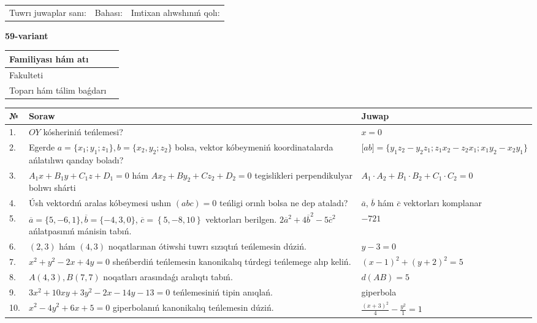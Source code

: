 \documentclass{article}
\begin{document}
\vspace{1cm}

\begin{tabular}{lll}
Tuwrı juwaplar sanı: \underline{\hspace{1.5cm}} & 
Bahası: \underline{\hspace{1.5cm}} & 
Imtixan alıwshınıń qolı: \underline{\hspace{2cm}} \\
\end{tabular}

\egroup

\newpage


\textbf{59-variant}\\

\bgroup
\def\arraystretch{1.6} %

\begin{tabular}{|m{5.7cm}|m{9.5cm}|}
\hline
Familiyası hám atı & \\
\hline
Fakulteti  & \\
\hline
Toparı hám tálim baǵdarı  & \\
\hline
\end{tabular}

\vspace{1cm}

\begin{tabular}{|m{0.7cm}|m{10cm}|m{4cm}|}
\hline
№ & Soraw & Juwap \\
\hline
1. & $OY$ kósheriniń teńlemesi? & $x=0$ \\
\hline
2. & Egerde $a=\{ x_1; y_1; z_1\}, b=\{ x_2, y_2; z_2\}$ bolsa, vektor kóbeymeniń koordinatalarda ańlatılıwı qanday boladı? &  $\lbrack ab\rbrack=\{y_1z_2-y_2z_1; z_1x_2-z_2x_1; x_1y_2-x_2y_1\}$ \\
\hline
3. & $A_1x+B_1y+C_1z+D_1=0$ hám $Ax_2+By_2+Cz_2+D_2=0$ tegislikleri perpendikulyar bolıwı shárti & $A_1\cdot A_2+B_1\cdot B_2+C_1\cdot C_2=0$ \\
\hline
4. & Úsh vektordıń aralas kóbeymesi ushın $(abc)=0$ teńligi orınlı bolsa ne dep ataladı? & $\overline{a}$, $\overline{b}$ hám $\overline{c}$ vektorları komplanar \\
\hline
5. & $\overline{a}=\{5,-6, 1 \}, \overline{b}=\{-4, 3, 0 \} $, $\overline{c}=\left\{ 5,-8, 10 \right\}$ vektorları berilgen. $2{\overline{a}}^{2}+4{\overline{b}}^{2}-5{\overline{c}}^{2}$ ańlatpasınıń mánisin tabıń. & $-721$ \\
\hline
6. & $(2, 3)$ hám $(4, 3)$ noqatlarınan ótiwshi tuwrı sızıqtıń teńlemesin dúziń. & $ y-3=0$ \\
\hline
7. & $x^{2}+y^{2}-2x+4y=0$ sheńberdiń teńlemesin kanonikalıq túrdegi teńlemege alıp keliń. & $(x-1)^{2}+(y+2)^{2}=5$ \\
\hline
8. & $A(4, 3), B(7, 7)$ noqatları arasındaǵı aralıqtı tabıń. & $d(AB)=5$ \\
\hline
9. & $3x^{2}+10xy+3y^{2}-2x-14y-13=0$ teńlemesiniń tipin anıqlań. & giperbola \\
\hline
10. & $x^{2}-4y^{2}+6x+5=0$ giperbolanıń kanonikalıq teńlemesin dúziń. & $\frac{(x+3)^{2}}{4}-\frac{y^{2}}{1}=1$ \\
\hline
\end{tabular}
\end{document}
